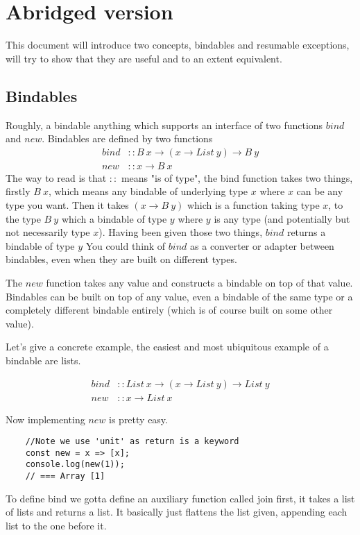 \section{Abridged version}
This document will introduce two concepts,
bindables and resumable exceptions,
will try to show that they are useful
and to an extent equivalent.

\subsection{Bindables}
Roughly, a bindable anything which supports an
interface of two functions $bind$ and $new$.
Bindables are defined by two functions
\begin{align}
    bind &:: B\ x \rightarrow (x \rightarrow List\ y) \rightarrow B\ y\\
    new &:: x \rightarrow B\ x
\end{align}
The way to read is that $::$ means "is of type",
the bind function takes two things,
firstly $B\ x$, which means any bindable of underlying type $x$
where $x$ can be any type you want.
Then it takes $(x \rightarrow B\ y)$ which
is a function taking type $x$,
to the type $B\ y$ which a bindable of type $y$
where $y$ is any type
(and potentially but not necessarily type $x$).
Having been given those two things,
$bind$ returns a bindable of type $y$
You could think of $bind$ as a converter
or adapter between bindables,
even when they are built on different types.

The $new$ function takes any value and
constructs a bindable on top of that value.
Bindables can be built on top of any value,
even a bindable of the same type
or a completely different bindable entirely
(which is of course built on some other value).

Let's give a concrete example,
the easiest and most ubiquitous example of a bindable are lists.

\begin{align}
    bind &:: List\ x \rightarrow (x \rightarrow List\ y) \rightarrow List\ y\\
    new &:: x \rightarrow List\ x
\end{align}

Now implementing $new$ is pretty easy.
\begin{verbatim}
    //Note we use 'unit' as return is a keyword
    const new = x => [x];
    console.log(new(1));
    // === Array [1]
\end{verbatim}

To define bind we gotta define an auxiliary function called join first,
it takes a list of lists and returns a list.
It basically just flattens the list given,
appending each list to the one before it.

